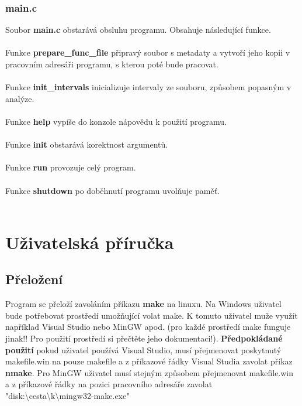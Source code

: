 \documentclass[11pt, a4paper]{article}
\begin{document}
\subsubsection{main.c}
Soubor \textbf{main.c} obstarává obsluhu programu. Obsahuje následující funkce.\\\\
Funkce \textbf{prepare\_func\_file} připravý soubor s metadaty a vytvoří jeho kopii v pracovním adresáři programu, s kterou poté bude pracovat.\\\\
Funkce \textbf{init\_intervals} inicializuje intervaly ze souboru, způsobem popasným v analýze.\\\\
Funkce \textbf{help} vypíše do konzole nápovědu k použití programu.\\\\
Funkce \textbf{init} obstarává korektnost argumentů.\\\\
Funkce \textbf{run} provozuje celý program.\\\\
Funkce \textbf{shutdown} po doběhnutí programu uvolňuje paměť.\\\\
\newpage
%
%
\section{Uživatelská příručka}
\subsection{Přeložení}
Program se přeloží zavoláním příkazu \textbf{make} na linuxu. Na Windows uživatel bude potřebovat prostředí umožňující volat make. K tomuto uživatel muže využít například Visual Studio nebo MinGW apod. (pro každé prostředí make funguje jinak!! Pro použití prostředí si přečtěte jeho dokumentaci!). \textbf{Předpokládané použití} pokud uživatel používá Visual Studio, musí přejmenovat poskytnutý makefile.win na pouze makefile a z příkazové řádky Visual Studia zavolat příkaz \textbf{nmake}. Pro MinGW uživatel musí stejným způsobem přejmenovat makefile.win a z příkazové řádky na pozici pracovního adresáře zavolat "disk:\textbackslash cesta\textbackslash k\textbackslash mingw32-make.exe"\par
\end{document}
